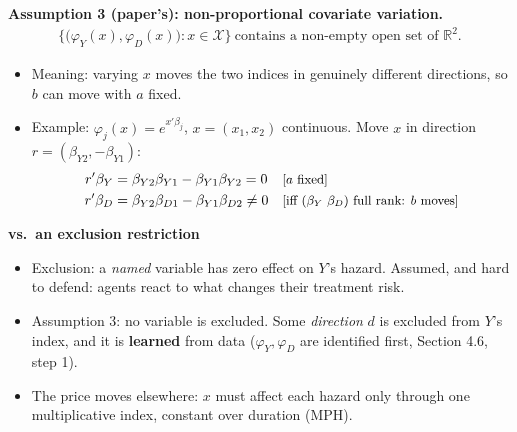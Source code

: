 \documentclass[11pt]{article}
\newcommand{\1}{\mathbf{1}}
\newcommand{\why}[1]{\text{\small[#1]}}
\begin{document}
\textbf{Assumption 3 (paper's): non-proportional covariate variation.}
\begin{align}
  \big\{\big(\varphi_Y(x),\varphi_D(x)\big):x\in\mathcal X\big\}\ \text{contains a non-empty open set of }\mathbb R^2. \nonumber
\end{align}
\begin{itemize}
  \item Meaning: varying $x$ moves the two indices in genuinely different directions, so $b$ can move with $a$ fixed.
  \item Example: $\varphi_j(x)=e^{x'\beta_j}$, $x=(x_1,x_2)$ continuous. Move $x$ in direction $r=(\beta_{Y2},-\beta_{Y1})$:
    \begin{align}
      r'\beta_Y &= \beta_{Y2}\beta_{Y1}-\beta_{Y1}\beta_{Y2}=0 && \why{$a$ fixed} \nonumber\\
      r'\beta_D &= \beta_{Y2}\beta_{D1}-\beta_{Y1}\beta_{D2}\neq0 && \why{iff $(\beta_Y\ \beta_D)$ full rank: $b$ moves} \nonumber
    \end{align}
\end{itemize}
\textbf{vs.\ an exclusion restriction}
\begin{itemize}
  \item Exclusion: a \emph{named} variable has zero effect on $Y$'s hazard. Assumed, and hard to defend: agents react to what changes their treatment risk.
  \item Assumption 3: no variable is excluded. Some \emph{direction} $d$ is excluded from $Y$'s index, and it is \textbf{learned} from data ($\varphi_Y,\varphi_D$ are identified first, Section 4.6, step 1).
  \item The price moves elsewhere: $x$ must affect each hazard only through one multiplicative index, constant over duration (MPH).
\end{itemize}
\end{document}
